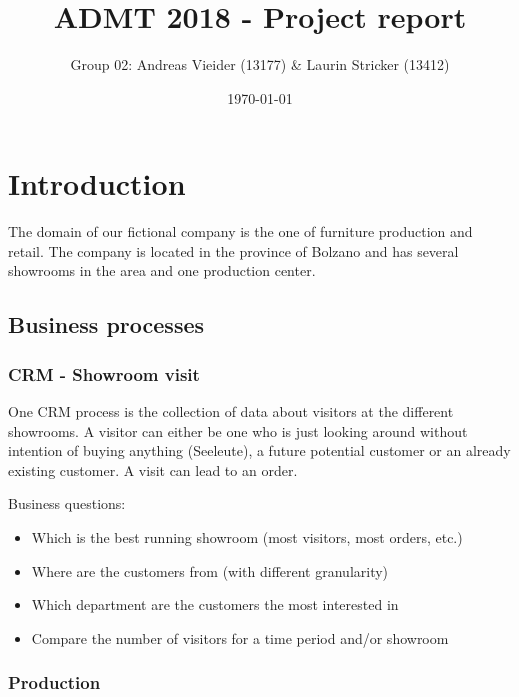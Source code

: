 \documentclass[letterpaper,12pt]{article}
\begin{document}
\title{ADMT 2018 - Project report}
\author{Group 02: Andreas Vieider (13177) \& Laurin Stricker (13412)}
\date{\today}
\maketitle

\tableofcontents
\listoffigures
\listoftables
\cleardoublepage




\section{Introduction}

The domain of our fictional company is the one of furniture production and retail. The company is located in the province of Bolzano and has several showrooms in the area and one production center.

\subsection{Business processes}

\subsubsection{CRM - Showroom visit}

One CRM process is the collection of data about visitors at the different showrooms. A visitor can either be one who is just looking around without intention of buying anything (Seeleute), a future potential customer or an already existing customer. A visit can lead to an order.

Business questions:
\begin{itemize}
        \item Which is the best running showroom (most visitors, most orders, etc.)
        \item Where are the customers from (with different granularity)
        \item Which department are the customers the most interested in
        \item Compare the number of visitors for a time period and/or showroom
\end{itemize}

\subsubsection{Production}
\end{document}
